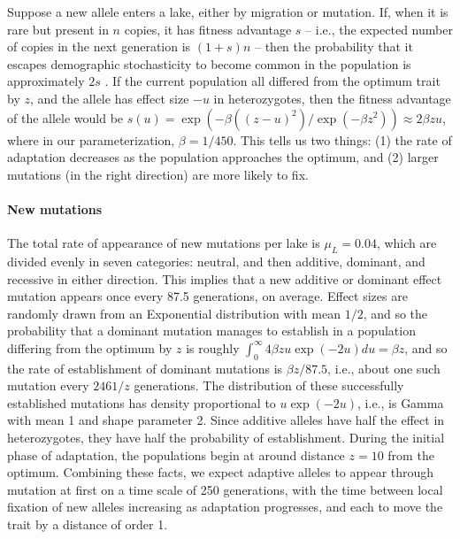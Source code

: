 \documentclass{article}
\begin{document}
Suppose a new allele enters a lake, either by migration or mutation.
If, when it is rare but present in $n$ copies,
it has fitness advantage $s$
-- i.e., the expected number of copies in the next generation is $(1+s)n$ --
then the probability that it escapes demographic stochasticity to become common in the population
is approximately $2s$ \citep{fisher,prob_fixation}.
If the current population all differed from the optimum trait by $z$,
and the allele has effect size $-u$ in heterozygotes,
then the fitness advantage of the allele would be
$s(u) = \exp(-\beta((z - u)^2) / \exp( - \beta z^2)) \approx 2 \beta z u$,
where in our parameterization, $\beta = 1 / 450$.
This tells us two things:
(1) the rate of adaptation decreases as the population approaches the optimum,
and (2) larger mutations (in the right direction) are more likely to fix.

\paragraph{New mutations}
The total rate of appearance of new mutations per lake is $\mu_L = 0.04$,
which are divided evenly in seven categories: neutral, and then additive, dominant, and recessive
in either direction.
This implies that a new additive or dominant effect mutation appears once every 87.5 generations,
on average.
Effect sizes are randomly drawn from an Exponential distribution with mean $1/2$, 
and so the probability that a dominant mutation manages to establish in a population differing from
the optimum by $z$ is roughly
$\int_0^\infty 4 \beta z u \exp(-2u) du = \beta z$,
and so the rate of establishment of dominant mutations is $\beta z / 87.5$,
i.e., about one such mutation every $2461/z$ generations.
The distribution of these successfully established mutations 
has density proportional to $u \exp(-2u)$, i.e., is Gamma with mean 1 and shape parameter 2.
Since additive alleles have half the effect in heterozygotes,
they have half the probability of establishment.
During the initial phase of adaptation,
the populations begin at around distance $z=10$ from the optimum.
Combining these facts, we expect 
adaptive alleles to appear through mutation at first on a time scale of 250 generations,
with the time between local fixation of new alleles increasing as adaptation progresses,
and each to move the trait by a distance of order 1.
\end{document}
